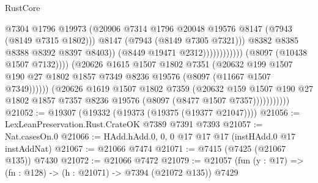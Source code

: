 \begin{lexlean}{RustCore}
\begin{coremodule}
                                                      @7304
                                                      @1796
                                                      @19973
                                                      (@20906
                                                        @7314
                                                        @1796
                                                        @20048
                                                        @19576
                                                        @8147
                                                        (@7943 (@8149 @7315 @1802)))
                                                      @8147
                                                      (@7943 (@8149 @7305 @7321)))
                                                    @8382
                                                    @8385
                                                    @8388
                                                    @8392
                                                    @8397
                                                    @8403))
                                                (@8449 @19471 @2312))))))))))))
                          (@8097 (@10438 @1507 @7132))))
                      (@20626
                        @1615
                        @1507
                        @1802
                        @7351
                        (@20632
                          @199
                          @1507
                          @190
                          @27
                          @1802
                          @1857
                          @7349
                          @8236
                          @19576
                          (@8097 (@11667 @1507 @7349))))))
                  (@20626
                    @1619
                    @1507
                    @1802
                    @7359
                    (@20632
                      @159
                      @1507
                      @190
                      @27
                      @1802
                      @1857
                      @7357
                      @8236
                      @19576
                      (@8097 (@8477 @1507 @7357)))))))))))
@21052 := @19307 (@19332 (@19373 (@19375 (@19377 @21047))))
@21056 := LexLeanPreservation.Rust.CrateOK @7389 @7391 @7393
@21057 := Nat.casesOn.{0}
@21066 := HAdd.hAdd.{0, 0, 0} @17 @17 @17 (instHAdd.{0} @17 instAddNat)
@21067 := @21066 @7474
@21071 := @7415 (@7425 (@21067 @135)) @7430
@21072 := @21066 @7472
@21079 := @21057 (fun (y : @17) => (fn : @128) -> (h : @21071) -> @7394 (@21072 @135)) @7429

\end{coremodule}
\end{lexlean}
